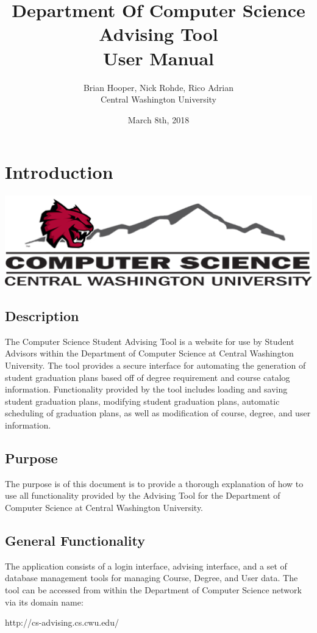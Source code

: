 \documentclass[]{article}
\title{Department Of Computer Science Advising Tool \\ User Manual}
\author{Brian Hooper, Nick Rohde, Rico Adrian \\ Central Washington University}
\date{March 8th, 2018}
\begin{document}
\maketitle
\tableofcontents


\pagebreak\section{Introduction}
	\includegraphics[width=\textwidth]{computer_science_logo.png}
	\subsection{Description}\label{ssec:1}
	
		The Computer Science Student Advising Tool is a website for use by Student Advisors within the Department of Computer Science at Central Washington University. The tool provides a secure interface for automating the generation of student graduation plans based off of degree requirement and course catalog information. Functionality provided by the tool includes loading and saving student graduation plans, modifying student graduation plans, automatic scheduling of graduation plans, as well as modification of course, degree, and user information. 
	\subsection{Purpose}\label{ssec:2}
	
		The purpose is of this document is to provide a thorough explanation of how to use all functionality provided by the Advising Tool for the Department of Computer Science at Central Washington University. 
	\subsection{General Functionality}\label{ssec:3}
	
		The application consists of a login interface, advising interface, and a set of database management tools for managing Course, Degree, and User data. The tool can be accessed from within the Department of Computer Science network via its domain name:
		\begin{center}
			http://cs-advising.cs.cwu.edu/
		\end{center}
\end{document}
